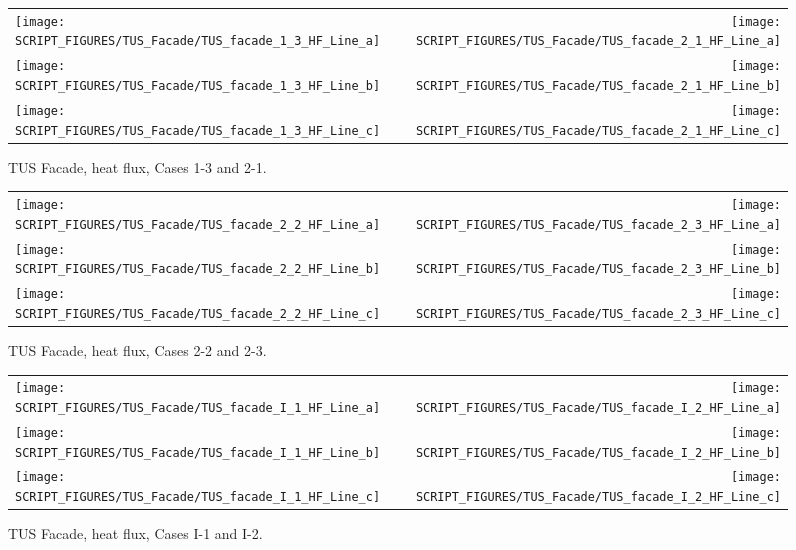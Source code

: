 \begin{figure}[p]
\begin{tabular*}{\textwidth}{l@{\extracolsep{\fill}}r}
\texttt{[image: SCRIPT\_FIGURES/TUS\_Facade/TUS\_facade\_1\_3\_HF\_Line\_a]} &
\texttt{[image: SCRIPT\_FIGURES/TUS\_Facade/TUS\_facade\_2\_1\_HF\_Line\_a]} \\
\texttt{[image: SCRIPT\_FIGURES/TUS\_Facade/TUS\_facade\_1\_3\_HF\_Line\_b]} &
\texttt{[image: SCRIPT\_FIGURES/TUS\_Facade/TUS\_facade\_2\_1\_HF\_Line\_b]} \\
\texttt{[image: SCRIPT\_FIGURES/TUS\_Facade/TUS\_facade\_1\_3\_HF\_Line\_c]} &
\texttt{[image: SCRIPT\_FIGURES/TUS\_Facade/TUS\_facade\_2\_1\_HF\_Line\_c]}
\end{tabular*}
\caption[TUS Facade, heat flux, Cases 1-3 and 2-1]{TUS Facade, heat flux, Cases 1-3 and 2-1.}
\label{TUS Facade_Heat_Flux_2}
\end{figure}

\begin{figure}[p]
\begin{tabular*}{\textwidth}{l@{\extracolsep{\fill}}r}
\texttt{[image: SCRIPT\_FIGURES/TUS\_Facade/TUS\_facade\_2\_2\_HF\_Line\_a]} &
\texttt{[image: SCRIPT\_FIGURES/TUS\_Facade/TUS\_facade\_2\_3\_HF\_Line\_a]} \\
\texttt{[image: SCRIPT\_FIGURES/TUS\_Facade/TUS\_facade\_2\_2\_HF\_Line\_b]} &
\texttt{[image: SCRIPT\_FIGURES/TUS\_Facade/TUS\_facade\_2\_3\_HF\_Line\_b]} \\
\texttt{[image: SCRIPT\_FIGURES/TUS\_Facade/TUS\_facade\_2\_2\_HF\_Line\_c]} &
\texttt{[image: SCRIPT\_FIGURES/TUS\_Facade/TUS\_facade\_2\_3\_HF\_Line\_c]}
\end{tabular*}
\caption[TUS Facade, heat flux, Cases 2-2 and 2-3]{TUS Facade, heat flux, Cases 2-2 and 2-3.}
\label{TUS Facade_Heat_Flux_3}
\end{figure}

\begin{figure}[p]
\begin{tabular*}{\textwidth}{l@{\extracolsep{\fill}}r}
\texttt{[image: SCRIPT\_FIGURES/TUS\_Facade/TUS\_facade\_I\_1\_HF\_Line\_a]} &
\texttt{[image: SCRIPT\_FIGURES/TUS\_Facade/TUS\_facade\_I\_2\_HF\_Line\_a]} \\
\texttt{[image: SCRIPT\_FIGURES/TUS\_Facade/TUS\_facade\_I\_1\_HF\_Line\_b]} &
\texttt{[image: SCRIPT\_FIGURES/TUS\_Facade/TUS\_facade\_I\_2\_HF\_Line\_b]} \\
\texttt{[image: SCRIPT\_FIGURES/TUS\_Facade/TUS\_facade\_I\_1\_HF\_Line\_c]} &
\texttt{[image: SCRIPT\_FIGURES/TUS\_Facade/TUS\_facade\_I\_2\_HF\_Line\_c]}
\end{tabular*}
\caption[TUS Facade, heat flux, Cases I-1 and I-2]{TUS Facade, heat flux, Cases I-1 and I-2.}
\label{TUS Facade_Heat_Flux_4}
\end{figure}


